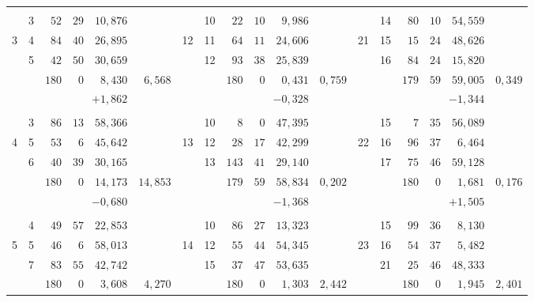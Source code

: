 \begin{center}
\begin{tabular}{|r|r|r@{\;}r@{\;}r|r||r|r|r@{\;}r@{\;}r|r||r|r|r@{\;}r@{\;}r|r|}
 &  &  &  &  &  &  &  &  &  &  &  &  &  &  &  &  & \\
 & 3 & $52$ & $29$ & $10{,}876$ &  &  & 10 & $22$ & $10$ & $9{,}986$ &  &  & 14 & $80$ & $10$ & $54{,}559$ & \\
3 & 4 & $84$ & $40$ & $26{,}895$ &  & 12 & 11 & $64$ & $11$ & $24{,}606$ &  & 21 & 15 & $15$ & $24$ & $48{,}626$ & \\
 & 5 & $42$ & $50$ & $30{,}659$ &  &  & 12 & $93$ & $38$ & $25{,}839$ &  &  & 16 & $84$ & $24$ & $15{,}820$ & \\
\cline{3-5}\cline{9-11}\cline{15-17}
 &  & $180$ & $0$ & $8{,}430$ & $6{,}568$ &  &  & $180$ & $0$ & $0{,}431$ & $0{,}759$ &  &  & $179$ & $59$ & $59{,}005$ & $0{,}349$\\
 &  & \multicolumn{3}{r|}{$+1{,}862$} &  &  &  & \multicolumn{3}{r|}{$-0{,}328$} &  &  &  & \multicolumn{3}{r|}{$-1{,}344$} & \\
 &  &  &  &  &  &  &  &  &  &  &  &  &  &  &  &  & \\
 & 3 & $86$ & $13$ & $58{,}366$ &  &  & 10 & $8$ & $0$ & $47{,}395$ &  &  & 15 & $7$ & $35$ & $56{,}089$ & \\
4 & 5 & $53$ & $6$ & $45{,}642$ &  & 13 & 12 & $28$ & $17$ & $42{,}299$ &  & 22 & 16 & $96$ & $37$ & $6{,}464$ & \\
 & 6 & $40$ & $39$ & $30{,}165$ &  &  & 13 & $143$ & $41$ & $29{,}140$ &  &  & 17 & $75$ & $46$ & $59{,}128$ & \\
\cline{3-5}\cline{9-11}\cline{15-17}
 &  & $180$ & $0$ & $14{,}173$ & $14{,}853$ &  &  & $179$ & $59$ & $58{,}834$ & $0{,}202$ &  &  & $180$ & $0$ & $1{,}681$ & $0{,}176$\\
 &  & \multicolumn{3}{r|}{$-0{,}680$} &  &  &  & \multicolumn{3}{r|}{$-1{,}368$} &  &  &  & \multicolumn{3}{r|}{$+1{,}505$} & \\
 &  &  &  &  &  &  &  &  &  &  &  &  &  &  &  &  & \\
 & 4 & $49$ & $57$ & $22{,}853$ &  &  & 10 & $86$ & $27$ & $13{,}323$ &  &  & 15 & $99$ & $36$ & $8{,}130$ & \\
5 & 5 & $46$ & $6$ & $58{,}013$ &  & 14 & 12 & $55$ & $44$ & $54{,}345$ &  & 23 & 16 & $54$ & $37$ & $5{,}482$ & \\
 & 7 & $83$ & $55$ & $42{,}742$ &  &  & 15 & $37$ & $47$ & $53{,}635$ &  &  & 21 & $25$ & $46$ & $48{,}333$ & \\
\cline{3-5}\cline{9-11}\cline{15-17}
 &  & $180$ & $0$ & $3{,}608$ & $4{,}270$ &  &  & $180$ & $0$ & $1{,}303$ & $2{,}442$ &  &  & $180$ & $0$ & $1{,}945$ & $2{,}401$\\

\end{tabular}
\end{center}
